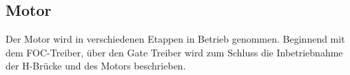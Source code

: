 \subsection{Motor}
\label{subsec:Inbetriebnahme_Motor}

Der Motor wird in verschiedenen Etappen in Betrieb genommen. Beginnend mit dem FOC-Treiber, über den Gate Treiber wird zum Schluss die Inbetriebnahme der H-Brücke und des Motors beschrieben.

